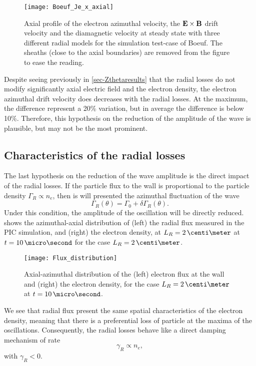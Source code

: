    
  \begin{figure}[hbt]
    \centering
    \texttt{[image: Boeuf\_Je\_x\_axial]}
    \caption{Axial profile of the electron azimuthal velocity, the ${\mathbf E} \times {\mathbf B}$ drift velocity and the diamagnetic velocity at steady state with three different radial models for the simulation test-case of Boeuf. The sheaths (close to the axial boundaries) are removed from the figure to ease the reading.}
    \label{fig-Jetheta}
  \end{figure}

  Despite seeing previously in \cref{sec-Zthetaresults} that the radial losses do not modify significantly axial electric field and the electron density, the electron azimuthal drift velocity does decreases with the radial losses. 
  At the maximum, the difference represent a 20\% variation, but in average the difference is below 10\%.
  Therefore, this hypothesis on the reduction of the amplitude of the wave is plausible, but may not be the most prominent.

\FloatBarrier


\subsection{Characteristics of the radial losses}

The last hypothesis on the reduction of the wave amplitude is the direct impact of the radial losses.
If the particle flux to the wall is proportional to the particle density $\Gamma_R \propto n_e$, then is will presented the azimuthal fluctuation of the wave
\[ \Gamma_R(\theta) = \Gamma_0 + \delta \Gamma_R(\theta). \]
Under this condition, the amplitude of the oscillation will be directly reduced.
 shows the azimuthal-axial distribution of (left) the radial flux measured in the \ac{PIC} simulation, and (right) the electron density, at $L_R=2\,\centi\meter$ at $t=10\,\micro\second$ for the case $L_R=2\,\centi\meter$.

\begin{figure}[hbtp]
  \centering
  \texttt{[image: Flux\_distribution]}
  \caption{Axial-azimuthal distribution of the (left) electron flux at the wall and (right) the electron density, for the case $L_R=2\,\centi\meter$ at $t=10\,\micro\second$.}
  \label{fig-rfluxs}
\end{figure}

We see that radial flux present the same spatial characteristics of the electron density, meaning that there is a preferential loss of particle at the maxima of the oscillations.
Consequently, the radial losses behave like a direct damping mechanism of rate 
\[  \gamma_R \propto n_e, \]
with $\gamma_R < 0.$

